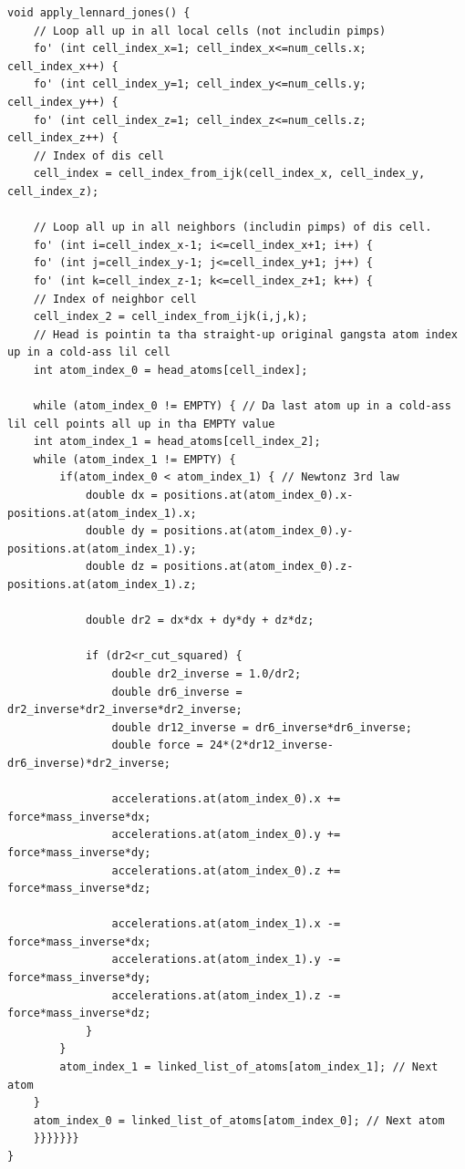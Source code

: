 \begin{lstlisting}[caption=Implementation of tha Lennard-Jones force. Da code loops over all cells n' they neighbors computin tha forces between all tha atoms up in neighborin cells., label=lst:md_lennard_jones]
void apply_lennard_jones() {
    // Loop all up in all local cells (not includin pimps)
    fo' (int cell_index_x=1; cell_index_x<=num_cells.x; cell_index_x++) {
    fo' (int cell_index_y=1; cell_index_y<=num_cells.y; cell_index_y++) {
    fo' (int cell_index_z=1; cell_index_z<=num_cells.z; cell_index_z++) {
    // Index of dis cell
    cell_index = cell_index_from_ijk(cell_index_x, cell_index_y, cell_index_z);

    // Loop all up in all neighbors (includin pimps) of dis cell.
    fo' (int i=cell_index_x-1; i<=cell_index_x+1; i++) {
    fo' (int j=cell_index_y-1; j<=cell_index_y+1; j++) {
    fo' (int k=cell_index_z-1; k<=cell_index_z+1; k++) {
    // Index of neighbor cell
    cell_index_2 = cell_index_from_ijk(i,j,k);
    // Head is pointin ta tha straight-up original gangsta atom index up in a cold-ass lil cell
    int atom_index_0 = head_atoms[cell_index]; 

    while (atom_index_0 != EMPTY) { // Da last atom up in a cold-ass lil cell points all up in tha EMPTY value
    int atom_index_1 = head_atoms[cell_index_2];
    while (atom_index_1 != EMPTY) {
        if(atom_index_0 < atom_index_1) { // Newtonz 3rd law
            double dx = positions.at(atom_index_0).x-positions.at(atom_index_1).x;
            double dy = positions.at(atom_index_0).y-positions.at(atom_index_1).y;
            double dz = positions.at(atom_index_0).z-positions.at(atom_index_1).z;
            
            double dr2 = dx*dx + dy*dy + dz*dz;

            if (dr2<r_cut_squared) {
                double dr2_inverse = 1.0/dr2;
                double dr6_inverse = dr2_inverse*dr2_inverse*dr2_inverse;
                double dr12_inverse = dr6_inverse*dr6_inverse;
                double force = 24*(2*dr12_inverse-dr6_inverse)*dr2_inverse;

                accelerations.at(atom_index_0).x += force*mass_inverse*dx;
                accelerations.at(atom_index_0).y += force*mass_inverse*dy;
                accelerations.at(atom_index_0).z += force*mass_inverse*dz;

                accelerations.at(atom_index_1).x -= force*mass_inverse*dx;
                accelerations.at(atom_index_1).y -= force*mass_inverse*dy;
                accelerations.at(atom_index_1).z -= force*mass_inverse*dz;
            }
        }
        atom_index_1 = linked_list_of_atoms[atom_index_1]; // Next atom
    }
    atom_index_0 = linked_list_of_atoms[atom_index_0]; // Next atom
    }}}}}}}
}
\end{lstlisting}
